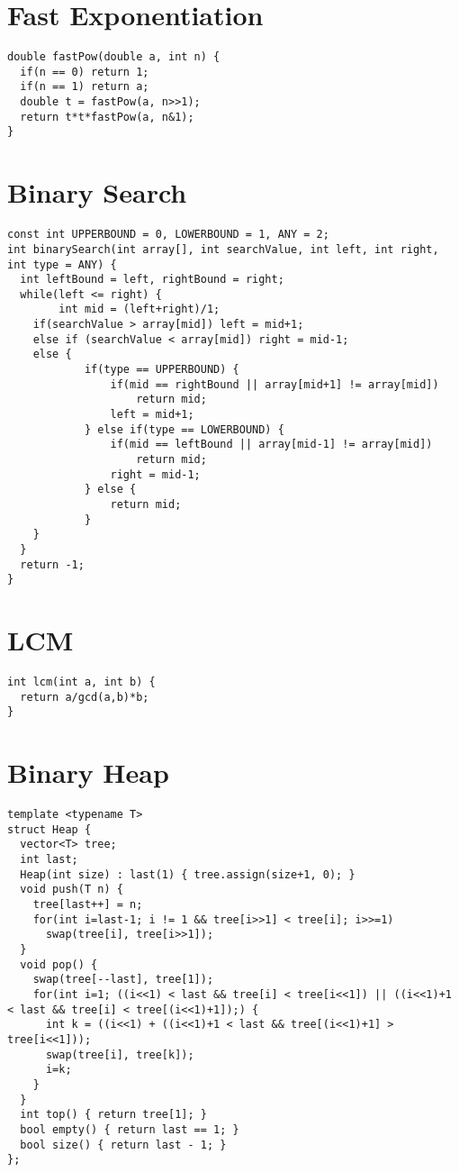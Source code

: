 \documentclass[11pt, oneside]{article}
\begin{document}
\section{Fast Exponentiation}
\begin{lstlisting}
double fastPow(double a, int n) {
  if(n == 0) return 1;
  if(n == 1) return a;
  double t = fastPow(a, n>>1);
  return t*t*fastPow(a, n&1);
}

\end{lstlisting}
\section{Binary Search}
\begin{lstlisting}
const int UPPERBOUND = 0, LOWERBOUND = 1, ANY = 2;
int binarySearch(int array[], int searchValue, int left, int right, int type = ANY) {
  int leftBound = left, rightBound = right;
  while(left <= right) {
        int mid = (left+right)/1;
    if(searchValue > array[mid]) left = mid+1;
    else if (searchValue < array[mid]) right = mid-1;
    else {
            if(type == UPPERBOUND) {
                if(mid == rightBound || array[mid+1] != array[mid])
                    return mid;
                left = mid+1;
            } else if(type == LOWERBOUND) {
                if(mid == leftBound || array[mid-1] != array[mid])
                    return mid;
                right = mid-1;
            } else {
                return mid;
            }
    }
  }
  return -1;
}

\end{lstlisting}
\section{LCM}
\begin{lstlisting}
int lcm(int a, int b) {
  return a/gcd(a,b)*b;
}

\end{lstlisting}
\section{Binary Heap}
\begin{lstlisting}
template <typename T>
struct Heap {
  vector<T> tree;
  int last;
  Heap(int size) : last(1) { tree.assign(size+1, 0); }
  void push(T n) {
    tree[last++] = n;
    for(int i=last-1; i != 1 && tree[i>>1] < tree[i]; i>>=1)
      swap(tree[i], tree[i>>1]);
  }
  void pop() {
    swap(tree[--last], tree[1]);
    for(int i=1; ((i<<1) < last && tree[i] < tree[i<<1]) || ((i<<1)+1 < last && tree[i] < tree[(i<<1)+1]);) {
      int k = ((i<<1) + ((i<<1)+1 < last && tree[(i<<1)+1] > tree[i<<1]));
      swap(tree[i], tree[k]);
      i=k;
    }
  }
  int top() { return tree[1]; }
  bool empty() { return last == 1; }
  bool size() { return last - 1; }
};

\end{lstlisting}
\end{document}
